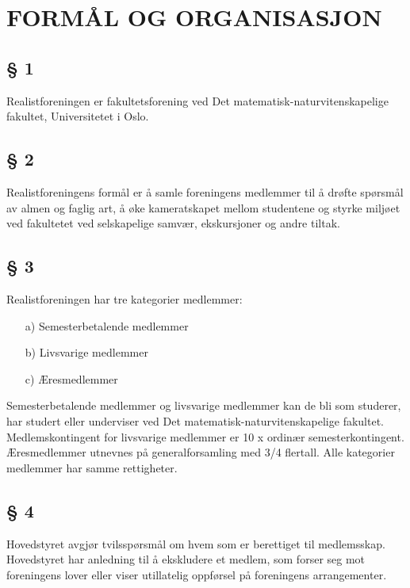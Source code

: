 \section*{FORMÅL OG ORGANISASJON}


\subsection*{§ 1}

Realistforeningen er fakultetsforening ved Det
matematisk-naturvitenskapelige fakultet, Universitetet i Oslo.


\subsection*{§ 2}

Realistforeningens formål er å samle foreningens medlemmer til å
drøfte spørsmål av almen og faglig art, å øke kameratskapet mellom
studentene og styrke miljøet ved fakultetet ved selskapelige samvær,
ekskursjoner og andre tiltak.


\subsection*{§ 3}

Realistforeningen har tre kategorier medlemmer: 

\begin{itemize}
\item [a)] Semesterbetalende medlemmer 
\item [b)] Livsvarige medlemmer 
\item [c)] Æresmedlemmer 
\end{itemize}

Semesterbetalende medlemmer og livsvarige medlemmer kan de bli som
studerer, har studert eller underviser ved Det
matematisk-naturvitenskapelige fakultet. Medlemskontingent for
livsvarige medlemmer er 10 x ordinær semesterkontingent.
Æresmedlemmer utnevnes på generalforsamling med 3/4 flertall. Alle
kategorier medlemmer har samme rettigheter.


\subsection*{§ 4}

Hovedstyret avgjør tvilsspørsmål om hvem som er berettiget til
medlemsskap.  Hovedstyret har anledning til å ekskludere et medlem,
som forser seg mot foreningens lover eller viser utillatelig oppførsel
på foreningens arrangementer.


